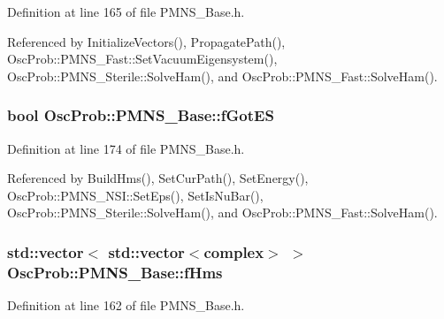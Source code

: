 Definition at line 165 of file P\+M\+N\+S\+\_\+\+Base.\+h.



Referenced by Initialize\+Vectors(), Propagate\+Path(), Osc\+Prob\+::\+P\+M\+N\+S\+\_\+\+Fast\+::\+Set\+Vacuum\+Eigensystem(), Osc\+Prob\+::\+P\+M\+N\+S\+\_\+\+Sterile\+::\+Solve\+Ham(), and Osc\+Prob\+::\+P\+M\+N\+S\+\_\+\+Fast\+::\+Solve\+Ham().

\subsubsection[{\texorpdfstring{f\+Got\+ES}{fGotES}}]{\setlength{\rightskip}{0pt plus 5cm}bool Osc\+Prob\+::\+P\+M\+N\+S\+\_\+\+Base\+::f\+Got\+ES\hspace{0.3cm}{\ttfamily [protected]}}\hypertarget{classOscProb_1_1PMNS__Base_a6dc5cd010d2d70b2324745b4e53e9839}{}\label{classOscProb_1_1PMNS__Base_a6dc5cd010d2d70b2324745b4e53e9839}


Definition at line 174 of file P\+M\+N\+S\+\_\+\+Base.\+h.



Referenced by Build\+Hms(), Set\+Cur\+Path(), Set\+Energy(), Osc\+Prob\+::\+P\+M\+N\+S\+\_\+\+N\+S\+I\+::\+Set\+Eps(), Set\+Is\+Nu\+Bar(), Osc\+Prob\+::\+P\+M\+N\+S\+\_\+\+Sterile\+::\+Solve\+Ham(), and Osc\+Prob\+::\+P\+M\+N\+S\+\_\+\+Fast\+::\+Solve\+Ham().

\subsubsection[{\texorpdfstring{f\+Hms}{fHms}}]{\setlength{\rightskip}{0pt plus 5cm}std\+::vector$<$ std\+::vector$<${\bf complex}$>$ $>$ Osc\+Prob\+::\+P\+M\+N\+S\+\_\+\+Base\+::f\+Hms\hspace{0.3cm}{\ttfamily [protected]}}\hypertarget{classOscProb_1_1PMNS__Base_adf5901166216e8c7a5cff2092952f473}{}\label{classOscProb_1_1PMNS__Base_adf5901166216e8c7a5cff2092952f473}


Definition at line 162 of file P\+M\+N\+S\+\_\+\+Base.\+h.



